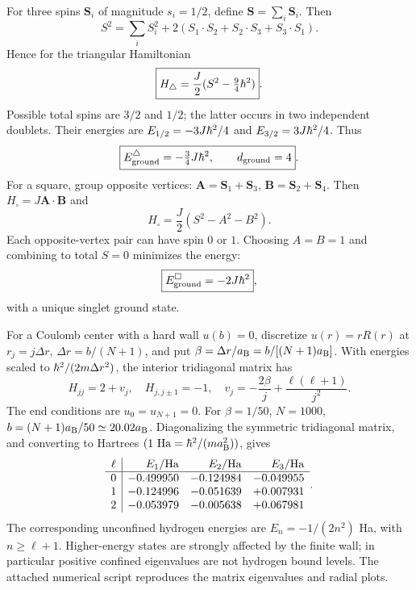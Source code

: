 For three spins $\mathbf S_i$ of magnitude
$s_i=1/2$, define $\mathbf S=\sum_i\mathbf S_i$.
Then
\begin{equation}
S^2=\sum_iS_i^2+
2(S_1\cdot S_2+S_2\cdot S_3+S_3\cdot S_1).
\end{equation}
Hence for the triangular Hamiltonian
\begin{equation}
\boxed{H_\triangle=
\frac J2(S^2-\tfrac94\hbar^2)}.
\end{equation}
Possible total spins are $3/2$ and $1/2$;
the latter occurs in two independent doublets.
Their energies are
$E_{1/2}=-3J\hbar^2/4$ and
$E_{3/2}=3J\hbar^2/4$.
Thus
\begin{equation}
\boxed{E_{\rm ground}^{\triangle}=-\tfrac34J\hbar^2,
\qquad d_{\rm ground}=4}.
\end{equation}
For a square, group opposite vertices:
$\mathbf A=\mathbf S_1+\mathbf S_3$,
$\mathbf B=\mathbf S_2+\mathbf S_4$.
Then $H_\square=J\mathbf A\cdot\mathbf B$
and
\begin{equation}
\boxed{H_\square=
\frac J2(S^2-A^2-B^2)}.
\end{equation}
Each opposite-vertex pair can have
spin $0$ or $1$. Choosing $A=B=1$
and combining to total $S=0$ minimizes
the energy:
\begin{equation}
\boxed{E_{\rm ground}^{\square}=-2J\hbar^2},
\end{equation}
with a unique singlet ground state.

For a Coulomb center with a hard wall
$u(b)=0$, discretize
$u(r)=rR(r)$ at $r_j=j\Delta r$,
$\Delta r=b/(N+1)$, and put
$\beta=\Delta r/a_{\mathrm B}=b/[(N+1)a_{\mathrm B}]$.
With energies scaled to $\hbar^2/(2m\Delta r^2)$,
the interior tridiagonal matrix has
\begin{equation}
\boxed{H_{jj}=2+v_j,\quad
H_{j,j\pm1}=-1,\quad
v_j=-\frac{2\beta}{j}
+\frac{\ell(\ell+1)}{j^2}}.
\end{equation}
The end conditions are $u_0=u_{N+1}=0$.
For $\beta=1/50$, $N=1000$,
$b=(N+1)a_{\mathrm B}/50\simeq20.02a_{\mathrm B}$.
Diagonalizing the symmetric tridiagonal matrix,
and converting to Hartrees
$(1\ {\rm Ha}=\hbar^2/(ma_{\mathrm B}^2))$, gives
\begin{equation}
\begin{array}{c|rrr}
\ell& E_1/{\rm Ha}&E_2/{\rm Ha}&E_3/{\rm Ha}\\\hline
0&-0.499950&-0.124984&-0.049955\\
1&-0.124996&-0.051639&+0.007931\\
2&-0.053979&-0.005638&+0.067981
\end{array}.
\end{equation}
The corresponding unconfined hydrogen energies
are $E_n=-1/(2n^2)$ Ha, with
$n\ge\ell+1$. Higher-energy states are
strongly affected by the finite wall; in
particular positive confined eigenvalues
are not hydrogen bound levels.
The attached numerical script reproduces
the matrix eigenvalues and radial plots.

